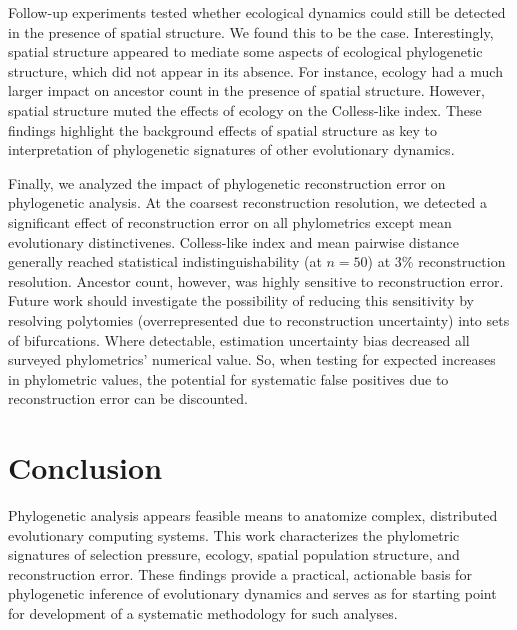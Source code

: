 Follow-up experiments tested whether ecological dynamics could still be detected in the presence of spatial structure.
We found this to be the case.
Interestingly, spatial structure appeared to mediate some aspects of ecological phylogenetic structure, which did not appear in its absence.
For instance, ecology had a much larger impact on ancestor count in the presence of spatial structure.
However, spatial structure muted the effects of ecology on the Colless-like index.
These findings highlight the background effects of spatial structure as key to interpretation of phylogenetic signatures of other evolutionary dynamics.

Finally, we analyzed the impact of phylogenetic reconstruction error on phylogenetic analysis.
At the coarsest reconstruction resolution, we detected a significant effect of reconstruction error on all phylometrics except mean evolutionary distinctivenes.
Colless-like index and mean pairwise distance generally reached statistical indistinguishability (at $n=50$) at 3\% reconstruction resolution.
Ancestor count, however, was highly sensitive to reconstruction error.
Future work should investigate the possibility of reducing this sensitivity by resolving polytomies (overrepresented due to reconstruction uncertainty) into sets of bifurcations.
Where detectable, estimation uncertainty bias decreased all surveyed phylometrics' numerical value.
So, when testing for expected increases in phylometric values, the potential for systematic false positives due to reconstruction error can be discounted.

\vspace{-1.5ex}
\section{Conclusion}

Phylogenetic analysis appears feasible means to anatomize complex, distributed evolutionary computing systems.
This work characterizes the phylometric signatures of selection pressure, ecology, spatial population structure, and reconstruction error.
These findings provide a practical, actionable basis for phylogenetic inference of evolutionary dynamics and serves as for starting point for development of a systematic methodology for such analyses.
